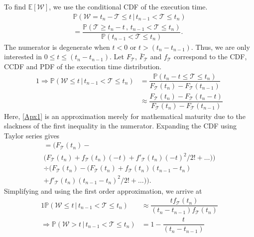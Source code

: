 To find 
$\mathbb{E}[\mathcal{W}]$, we use the conditional \ac{CDF} of the execution time.
\begin{multline*}
\mathbb{P}(\mathcal{W}=t_n-\mathcal{T}\leq t\,\big\vert\,t_{n-1}<\mathcal{T}\leq t_n)\\=\dfrac{\mathbb{P}(\mathcal{T}\geq t_n-t\,,\,t_{n-1}<\mathcal{T}\leq t_n)}{\mathbb{P}(t_{n-1}<\mathcal{T}\leq t_n)}.
\end{multline*}
The numerator is degenerate when $t\!<\!0$ or $t\!>\!(t_n\!-\!t_{n-1})$.
Thus, we are only interested in $0\!\leq\!t\!\leq\! (t_n-t_{n-1})$.
Let $F_{\mathcal{T}}$, $\bar{F}_{\mathcal{T}}$ and $f_{\mathcal{T}}$ correspond to the \ac{CDF}, \ac{CCDF} and \ac{PDF} of the execution time distribution.
\begin{alignat}{1}
\!\!\!\Rightarrow\mathbb{P}(\mathcal{W}\leq t\,\big\vert\,t_{n-1}<\mathcal{T}\leq t_n)&=\dfrac{\mathbb{P}(t_n-t\leq\mathcal{T}\leq t_n)}{F_\mathcal{T}(t_n)-F_\mathcal{T}(t_{n-1})}\nonumber\\
&\approx\dfrac{F_\mathcal{T}(t_n)-F_\mathcal{T}(t_{n}-t)}{F_\mathcal{T}(t_n)-F_\mathcal{T}(t_{n-1})}\label{Apx1}
\end{alignat}
Here, \cref{Apx1} is an approximation merely for mathematical maturity due to the slackness of the first inequality in the numerator.
Expanding the \ac{CDF} using Taylor series gives
\begin{multline*}
    =\Big(F_\mathcal{T}(t_n)-\\\big(F_\mathcal{T}(t_n)+f_\mathcal{T}(t_n)(-t)+f'_\mathcal{T}(t_n)(-t)^2/2!+\dots\big)\Big)\\
    \div \Big(F_\mathcal{T}(t_n)-\big(F_\mathcal{T}(t_n)+f_\mathcal{T}(t_n)(t_{n-1}-t_n)\\+f'_\mathcal{T}(t_n)(t_{n-1}-t_n)^2/2!+\dots\big)\Big).
\end{multline*}
Simplifying and using the first order approximation, we arrive at
\begin{alignat}{1}
\mathbb{P}(\mathcal{W}\leq t\,\big\vert\,t_{n-1}<\mathcal{T}\leq t_n)&\approx\dfrac{tf_\mathcal{T}(t_n)}{(t_{n}-t_{n-1})f_\mathcal{T}(t_n)}\label{Apx2}\\
\Rightarrow\mathbb{P}(\mathcal{W}> t\,|\,t_{n-1}<\mathcal{T}\leq t_n)&= 1-\dfrac{t}{(t_{n}-t_{n-1})}\nonumber
\end{alignat}

